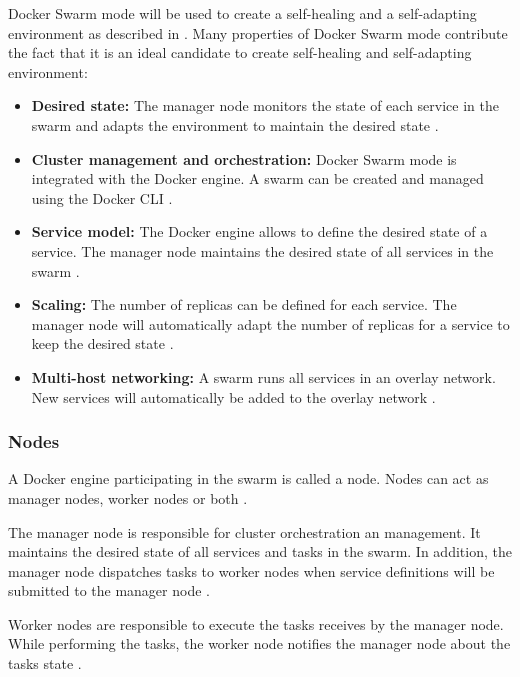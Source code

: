 Docker Swarm mode will be used to create a self-healing and a self-adapting environment as described in .
% 
Many properties of Docker Swarm mode contribute the fact that it is an ideal candidate to create self-healing and self-adapting environment:
\begin{itemize}
\item \textbf{Desired state:} The manager node monitors the state of each service in the swarm and adapts the environment to maintain the desired state \cite{Docker2020Docs}.

\item \textbf{Cluster management and orchestration:} Docker Swarm mode is integrated with the Docker engine. A swarm can be created and managed using the Docker CLI \cite{Docker2020Docs}.

\item \textbf{Service model:} The Docker engine allows to define the desired state of a service. The manager node maintains the desired state of all services in the swarm \cite{Docker2020Docs}.

\item \textbf{Scaling:} The number of replicas can be defined for each service. The manager node will automatically adapt the number of replicas for a service to keep the desired state \cite{Docker2020Docs}.

\item \textbf{Multi-host networking:} A swarm runs all services in an overlay network. New services will automatically be added to the overlay network \cite{Docker2020Docs}.
\end{itemize}


\subsubsection{Nodes}
A Docker engine participating in the swarm is called a node.
Nodes can act as manager nodes, worker nodes or both \cite{Docker2020Docs}.


The manager node is responsible for cluster orchestration an management. It maintains the desired state of all services and tasks in the swarm. In addition, the manager node dispatches tasks to worker nodes when service definitions will be submitted to the manager node \cite{Docker2020Docs}.


Worker nodes are responsible to execute the tasks receives by the manager node. While performing the tasks, the worker node notifies the manager node about the tasks state \cite{Docker2020Docs}.


